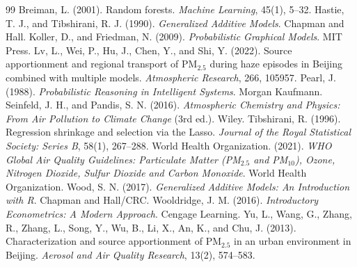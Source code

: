 \documentclass[11pt]{article}
\begin{document}
\begin{thebibliography}{99}
 Breiman, L. (2001). Random forests. \emph{Machine Learning}, 45(1), 5--32.
 Hastie, T. J., and Tibshirani, R. J. (1990). \emph{Generalized Additive Models}. Chapman and Hall.
 Koller, D., and Friedman, N. (2009). \emph{Probabilistic Graphical Models}. MIT Press.
 Lv, L., Wei, P., Hu, J., Chen, Y., and Shi, Y. (2022). Source apportionment and regional transport of PM$_{2.5}$ during haze episodes in Beijing combined with multiple models. \emph{Atmospheric Research}, 266, 105957.
 Pearl, J. (1988). \emph{Probabilistic Reasoning in Intelligent Systems}. Morgan Kaufmann.
 Seinfeld, J. H., and Pandis, S. N. (2016). \emph{Atmospheric Chemistry and Physics: From Air Pollution to Climate Change} (3rd ed.). Wiley.
 Tibshirani, R. (1996). Regression shrinkage and selection via the Lasso. \emph{Journal of the Royal Statistical Society: Series B}, 58(1), 267--288.
 World Health Organization. (2021). \emph{WHO Global Air Quality Guidelines: Particulate Matter (PM$_{2.5}$ and PM$_{10}$), Ozone, Nitrogen Dioxide, Sulfur Dioxide and Carbon Monoxide}. World Health Organization.
 Wood, S. N. (2017). \emph{Generalized Additive Models: An Introduction with R}. Chapman and Hall/CRC.
 Wooldridge, J. M. (2016). \emph{Introductory Econometrics: A Modern Approach}. Cengage Learning.
 Yu, L., Wang, G., Zhang, R., Zhang, L., Song, Y., Wu, B., Li, X., An, K., and Chu, J. (2013). Characterization and source apportionment of PM$_{2.5}$ in an urban environment in Beijing. \emph{Aerosol and Air Quality Research}, 13(2), 574--583.
\end{thebibliography}
\end{document}
